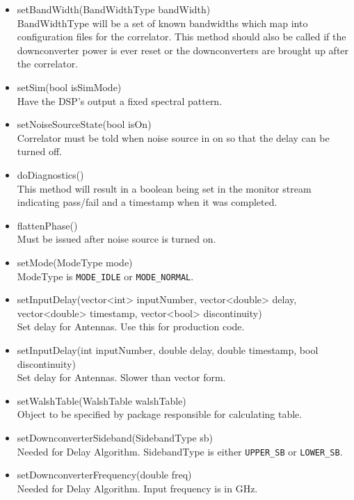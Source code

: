 \documentclass[11pt]{article}
\begin{document}
\begin{itemize}
\item setBandWidth(BandWidthType bandWidth)\\
      BandWidthType will be a set of known bandwidths which map into
      configuration files for the correlator. This method should also
      be called if the downconverter power is ever reset or the
      downconverters are brought up after the correlator.
\item setSim(bool isSimMode) \\
      Have the DSP's output a fixed spectral pattern.
\item setNoiseSourceState(bool isOn) \\
      Correlator must be told when noise source in on so that the delay
      can be turned off.
\item doDiagnostics() \\
      This method will result in a boolean being set in the monitor stream
      indicating pass/fail and a timestamp when it was completed.
\item flattenPhase() \\
      Must be issued after noise source is turned on.
\item setMode(ModeType mode) \\
      ModeType is {\tt MODE\_IDLE} or {\tt MODE\_NORMAL}.
\item setInputDelay(vector<int> inputNumber,
                    vector<double> delay,
                    vector<double> timestamp,
                    vector<bool> discontinuity) \\
      Set delay for Antennas. Use this for production code.
\item setInputDelay(int inputNumber,
                    double delay,
                    double timestamp,
                    bool discontinuity) \\
      Set delay for Antennas. Slower than vector form.
\item setWalshTable(WalshTable walshTable) \\
      Object to be specified by package responsible for calculating table.
\item setDownconverterSideband(SidebandType sb) \\
      Needed for Delay Algorithm. SidebandType is either
      {\tt UPPER\_SB} or {\tt LOWER\_SB}.
\item setDownconverterFrequency(double freq) \\
      Needed for Delay Algorithm. Input frequency is in GHz.

\end{itemize}
\end{document}
